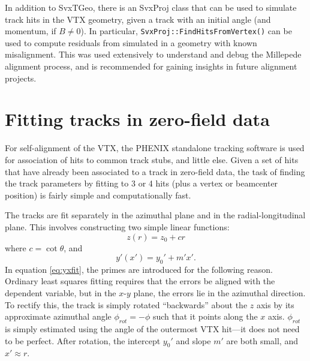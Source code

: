 \documentclass[12pt]{article}
\begin{document}
In addition to SvxTGeo, there is an SvxProj class that can be used to simulate track hits in the VTX geometry, given a track with an initial angle (and momentum, if $B \neq 0$). In particular, \texttt{SvxProj::FindHitsFromVertex()} can be used to compute residuals from simulated in a geometry with known misalignment. This was used extensively to understand and debug the Millepede alignment process, and is recommended for gaining insights in future alignment projects.

\section{Fitting tracks in zero-field data}
For self-alignment of the VTX, the PHENIX standalone tracking software is used for association of hits to common track stubs, and little else. Given a set of hits that have already been associated to a track in zero-field data, the task of finding the track parameters by fitting to 3 or 4 hits (plus a vertex or beamcenter position) is fairly simple and computationally fast.

The tracks are fit separately in the azimuthal plane and in the radial-longitudinal plane. This involves constructing two simple linear functions:
\begin{equation}\label{eq:zrfit}
z(r) = z_0 + cr
\end{equation}
where $c = \cot \theta$, and
\begin{equation}\label{eq:yxfit}
y'(x') = y_0' + m' x'.
\end{equation}
In equation \ref{eq:yxfit}, the primes are introduced for the following reason. Ordinary least squares fitting requires that the errors be aligned with the dependent variable, but in the $x$-$y$ plane, the errors lie in the azimuthal direction. To rectify this, the track is simply rotated ``backwards'' about the $z$ axis by its approximate azimuthal angle $\phi_{rot} = -\phi$ such that it points along the $x$ axis. $\phi_{rot}$ is simply estimated using the angle of the outermost VTX hit---it does not need to be perfect. After rotation, the intercept $y_0'$ and slope $m'$ are both small, and $x' \approx r$.
\end{document}
